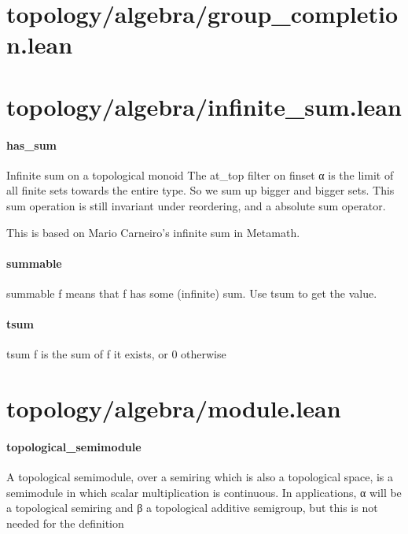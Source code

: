 \documentclass{article}
\begin{document}
\section{topology/algebra/group\_completion.lean}\section{topology/algebra/infinite\_sum.lean}\paragraph{has\_sum}
\par
Infinite sum on a topological monoid
The 
\colorbox[RGB]{253,246,227}{{{{\color[RGB]{101, 123, 131} at\_top }}}} filter on 
\colorbox[RGB]{253,246,227}{{{{\color[RGB]{101, 123, 131} finset α }}}} is the limit of all finite sets towards the entire type. So we sum
up bigger and bigger sets. This sum operation is still invariant under reordering, and a absolute
sum operator.
\par
This is based on Mario Carneiro's infinite sum in Metamath.
\paragraph{summable}
\par
\colorbox[RGB]{253,246,227}{{{{\color[RGB]{101, 123, 131} summable f }}}} means that 
\colorbox[RGB]{253,246,227}{{{{\color[RGB]{101, 123, 131} f }}}} has some (infinite) sum. Use 
\colorbox[RGB]{253,246,227}{{{{\color[RGB]{101, 123, 131} tsum }}}} to get the value.
\paragraph{tsum}
\par
\colorbox[RGB]{253,246,227}{{{{\color[RGB]{101, 123, 131} tsum f }}}} is the sum of 
\colorbox[RGB]{253,246,227}{{{{\color[RGB]{101, 123, 131} f }}}} it exists, or 0 otherwise
\section{topology/algebra/module.lean}\paragraph{topological\_semimodule}
\par
A topological semimodule, over a semiring which is also a topological space, is a
semimodule in which scalar multiplication is continuous. In applications, α will be a topological
semiring and β a topological additive semigroup, but this is not needed for the definition
\end{document}
